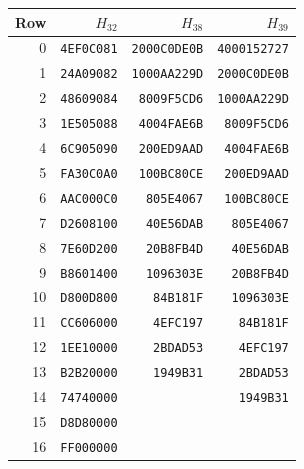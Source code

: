 \begin{tabular}{rrrr}
\toprule
Row & $H_{32}$ & $H_{38}$ & $H_{39}$\\
\midrule
0 & \texttt{4EF0C081} & \texttt{2000C0DE0B} & \texttt{4000152727}\\
1 & \texttt{24A09082} & \texttt{1000AA229D} & \texttt{2000C0DE0B}\\
2 & \texttt{48609084} & \texttt{8009F5CD6} & \texttt{1000AA229D}\\
3 & \texttt{1E505088} & \texttt{4004FAE6B} & \texttt{8009F5CD6}\\
4 & \texttt{6C905090} & \texttt{200ED9AAD} & \texttt{4004FAE6B}\\
5 & \texttt{FA30C0A0} & \texttt{100BC80CE} & \texttt{200ED9AAD}\\
6 & \texttt{AAC000C0} & \texttt{805E4067} & \texttt{100BC80CE}\\
7 & \texttt{D2608100} & \texttt{40E56DAB} & \texttt{805E4067}\\
8 & \texttt{7E60D200} & \texttt{20B8FB4D} & \texttt{40E56DAB}\\
9 & \texttt{B8601400} & \texttt{1096303E} & \texttt{20B8FB4D}\\
10 & \texttt{D800D800} & \texttt{84B181F} & \texttt{1096303E}\\
11 & \texttt{CC606000} & \texttt{4EFC197} & \texttt{84B181F}\\
12 & \texttt{1EE10000} & \texttt{2BDAD53} & \texttt{4EFC197}\\
13 & \texttt{B2B20000} & \texttt{1949B31} & \texttt{2BDAD53}\\
14 & \texttt{74740000} &  & \texttt{1949B31}\\
15 & \texttt{D8D80000} &  & \\
16 & \texttt{FF000000} &  & \\
\bottomrule
\end{tabular}
